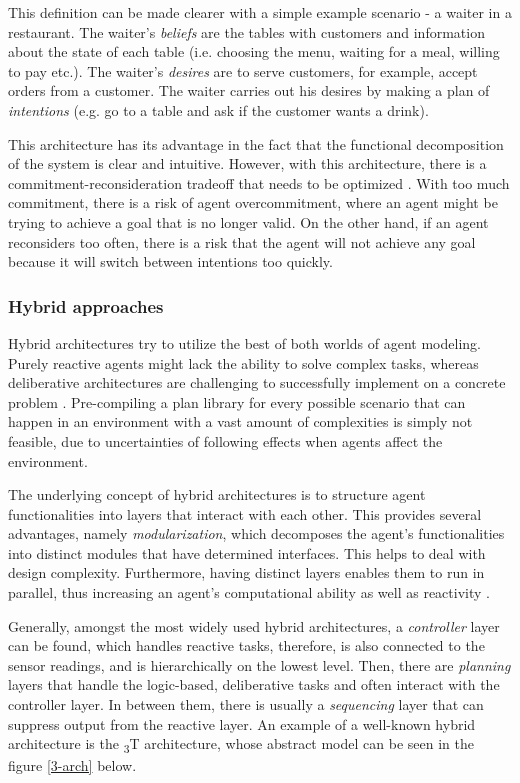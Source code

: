 \documentclass[0main.tex]{subfiles}
\begin{document}
This definition can be made clearer with a simple example scenario - a waiter in a restaurant.
The waiter's \emph{beliefs} are the tables with customers and information about the state of each
table (i.e. choosing the menu, waiting for a meal, willing to pay etc.). The waiter's \emph{desires}
are to serve customers, for example, accept orders from a customer. The waiter carries out his
desires by making a plan of \emph{intentions} (e.g. go to a table and ask if the customer wants a
drink).

This architecture has its advantage in the fact that the functional decomposition of the system
is clear and intuitive. However, with this architecture, there is a commitment-reconsideration
tradeoff that needs to be optimized \cite{Wooldridge1999}. With too much commitment, there is a
risk of agent overcommitment, where an agent might be trying to achieve a goal that is no
longer valid. On the other hand, if an agent reconsiders too often, there is a risk that the
agent will not achieve any goal because it will switch between intentions too quickly.

\subsubsection{Hybrid approaches}\label{hybrid-arch}

Hybrid architectures try to utilize the best of both worlds of agent modeling. Purely reactive 
agents might lack the ability to solve complex tasks, whereas deliberative architectures are 
challenging to successfully implement on a concrete problem \cite{Anthony2014}. Pre-compiling a plan
library for every possible scenario that can happen in an environment with a vast amount of complexities
is simply not feasible, due to uncertainties of following effects when agents 
affect the environment. 

The underlying concept of hybrid architectures is to structure agent functionalities into layers 
that interact with each other. This provides several advantages, namely \emph{modularization},
which decomposes the agent's functionalities into distinct modules that have determined 
interfaces. This helps to deal with design complexity. Furthermore, having distinct layers enables 
them to run in parallel, thus increasing an agent's computational ability as well as reactivity
\cite{Mueller1999}.

Generally, amongst the most widely used hybrid architectures, a \emph{controller} layer can be
found, which handles reactive tasks, therefore, is also connected to the sensor readings, and is 
hierarchically on the lowest level. Then, there are \emph{planning} layers that handle the
logic-based, deliberative tasks and often interact with the controller layer. In between them, 
there is usually a \emph{sequencing} layer that can suppress output from the reactive layer. 
An example of a well-known hybrid architecture is the \textsubscript{3}T architecture, whose 
abstract model can be seen in the figure \ref{3-arch} below.
\end{document}
